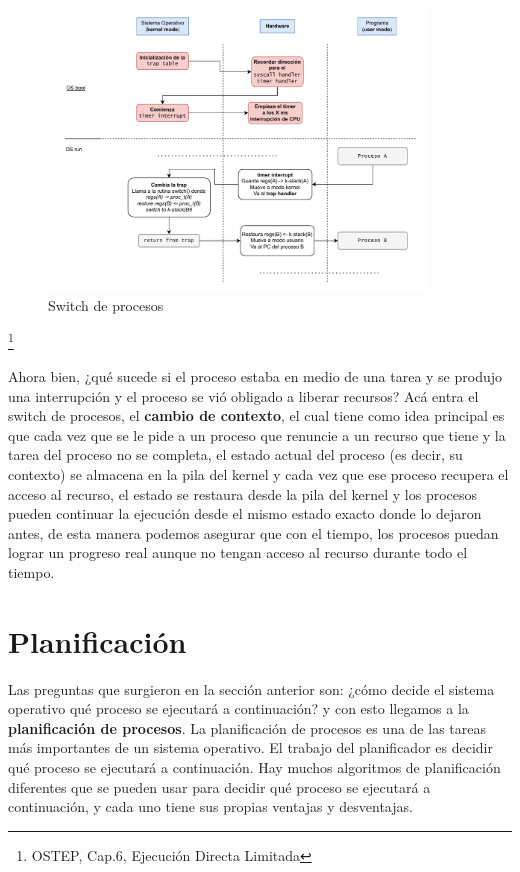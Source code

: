 \documentclass{article}
\begin{document}
\begin{figure}[h]
    \centering
    \includegraphics[width=0.9\textwidth]{src/edl3.pdf}
    \caption{Switch de procesos}
\end{figure} \footnote{OSTEP, Cap.6, Ejecución Directa Limitada}

Ahora bien, ¿qué sucede si el proceso estaba en medio de una tarea y se produjo una interrupción y el proceso se vió obligado a liberar recursos? Acá entra el switch de procesos, el \textbf{cambio de contexto}, el cual tiene como idea principal es que cada vez que se le pide a un proceso que renuncie a un recurso que tiene y la tarea del proceso no se completa, el estado actual del proceso (es decir, su contexto) se almacena en la pila del kernel y cada vez que ese proceso recupera el acceso al recurso, el estado se restaura desde la pila del kernel y los procesos pueden continuar la ejecución desde el mismo estado exacto donde lo dejaron antes, de esta manera podemos asegurar que con el tiempo, los procesos puedan lograr un progreso real aunque no tengan acceso al recurso durante todo el tiempo.


\newpage
\section{Planificación}
Las preguntas que surgieron en la sección anterior son: ¿cómo decide el sistema operativo qué proceso se ejecutará a continuación? y con esto llegamos a la \textbf{planificación de procesos}. La planificación de procesos es una de las tareas más importantes de un sistema operativo. El trabajo del planificador es decidir qué proceso se ejecutará a continuación. Hay muchos algoritmos de planificación diferentes que se pueden usar para decidir qué proceso se ejecutará a continuación, y cada uno tiene sus propias ventajas y desventajas.
\end{document}
